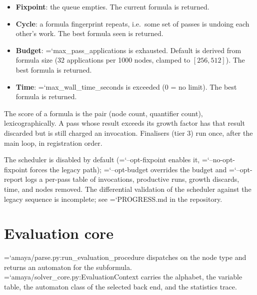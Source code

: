 \documentclass[10pt,a4paper]{article}
\newcommand{\code}[1]{{\small\ttfamily\hyphenchar\font=`\-\relax #1}}
\begin{document}
\begin{itemize}
  \item \textbf{Fixpoint}: the queue empties.  The current formula is returned.
  \item \textbf{Cycle}: a formula fingerprint repeats, i.e.\ some set of passes is undoing each other's
        work.  The best formula seen is returned.
  \item \textbf{Budget}: \code{max\_pass\_applications} is exhausted.  Default is derived from formula
        size (32 applications per 1000 nodes, clamped to $[256, 512]$).  The best formula is returned.
  \item \textbf{Time}: \code{max\_wall\_time\_seconds} is exceeded (0 = no limit).  The best formula is
        returned.
\end{itemize}

The score of a formula is the pair (node count, quantifier count), lexicographically.  A pass whose
result exceeds its growth factor has that result discarded but is still charged an invocation.
Finalisers (tier 3) run once, after the main loop, in registration order.

The scheduler is disabled by default (\code{--opt-fixpoint} enables it, \code{--no-opt-fixpoint}
forces the legacy path); \code{--opt-budget} overrides the budget and \code{--opt-report} logs a
per-pass table of invocations, productive runs, growth discards, time, and nodes removed.  The
differential validation of the scheduler against the legacy sequence is incomplete; see
\code{PROGRESS.md} in the repository.

\section{Evaluation core}
\label{sec:evalcore}

\code{amaya/parse.py:\allowbreak run\_\allowbreak evaluation\_\allowbreak procedure} dispatches on the node type and returns an automaton
for the subformula.  \code{amaya/solver\_\allowbreak core.py:\allowbreak EvaluationContext} carries the alphabet, the variable
table, the automaton class of the selected back end, and the statistics trace.
\end{document}
